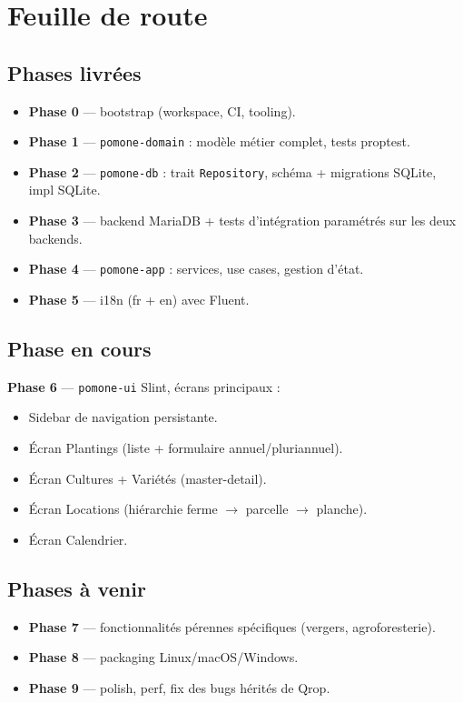 \section{Feuille de route}

\subsection{Phases livrées}

\begin{itemize}
  \item[$\boxtimes$] \textbf{Phase 0} — bootstrap (workspace, CI, tooling).
  \item[$\boxtimes$] \textbf{Phase 1} — \texttt{pomone-domain} : modèle métier complet, tests proptest.
  \item[$\boxtimes$] \textbf{Phase 2} — \texttt{pomone-db} : trait \texttt{Repository}, schéma + migrations SQLite, impl SQLite.
  \item[$\boxtimes$] \textbf{Phase 3} — backend MariaDB + tests d'intégration paramétrés sur les deux backends.
  \item[$\boxtimes$] \textbf{Phase 4} — \texttt{pomone-app} : services, use cases, gestion d'état.
  \item[$\boxtimes$] \textbf{Phase 5} — i18n (fr + en) avec Fluent.
\end{itemize}

\subsection{Phase en cours}

\textbf{Phase 6} — \texttt{pomone-ui} Slint, écrans principaux :

\begin{itemize}
  \item[$\boxtimes$] Sidebar de navigation persistante.
  \item[$\boxtimes$] Écran Plantings (liste + formulaire annuel/pluriannuel).
  \item[$\boxtimes$] Écran Cultures + Variétés (master-detail).
  \item[$\boxtimes$] Écran Locations (hiérarchie ferme $\to$ parcelle $\to$ planche).
  \item[$\square$] Écran Calendrier.
\end{itemize}

\subsection{Phases à venir}

\begin{itemize}
  \item[$\square$] \textbf{Phase 7} — fonctionnalités pérennes spécifiques (vergers, agroforesterie).
  \item[$\square$] \textbf{Phase 8} — packaging Linux/macOS/Windows.
  \item[$\square$] \textbf{Phase 9} — polish, perf, fix des bugs hérités de Qrop.
\end{itemize}

